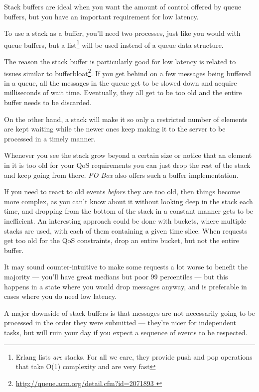 \documentclass[11pt, oneside]{book}   	%
\begin{document}
Stack buffers are ideal when you want the amount of control offered by queue buffers, but you have an important requirement for low latency.

To use a stack as a buffer, you'll need two processes, just like you would with queue buffers, but a list\footnote{Erlang lists \emph{are} stacks. For all we care, they provide push and pop operations that take O(1) complexity and are very fast} will be used instead of a queue data structure.

The reason the stack buffer is particularly good for low latency is related to issues similar to bufferbloat\footnote{\href{http://queue.acm.org/detail.cfm?id=2071893}{http://queue.acm.org/detail.cfm?id=2071893 }}. If you get behind on a few messages being buffered in a queue, all the messages in the queue get to be slowed down and acquire milliseconds of wait time. Eventually, they all get to be too old and the entire buffer needs to be discarded.


On the other hand, a stack will make it so only a restricted number of elements are kept waiting while the newer ones keep making it to the server to be processed in a timely manner.


Whenever you see the stack grow beyond a certain size or notice that an element in it is too old for your QoS requirements you can just drop the rest of the stack and keep going from there. \emph{PO Box} also offers such a buffer implementation.

If you need to react to old events \emph{before} they are too old, then things become more complex, as you can't know about it without looking deep in the stack each time, and dropping from the bottom of the stack in a constant manner gets to be inefficient. An interesting approach could be done with buckets, where multiple stacks are used, with each of them containing a given time slice. When requests get too old for the QoS constraints, drop an entire bucket, but not the entire buffer.

It may sound counter-intuitive to make some requests a lot worse to benefit the majority — you'll have great medians but poor 99 percentiles — but this happens in a state where you would drop messages anyway, and is preferable in cases where you do need low latency. 

A major downside of stack buffers is that messages are not necessarily going to be processed in the order they were submitted — they're nicer for independent tasks, but will ruin your day if you expect a sequence of events to be respected.
\end{document}
